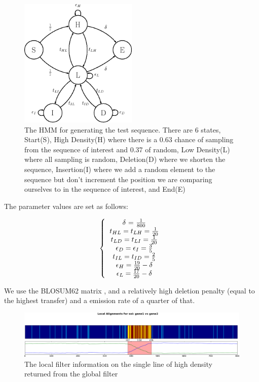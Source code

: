 \documentclass[phd,tocprelim]{cornell}
\begin{document}
\pagebreak

\begin{figure}[hpt]
	\centering
		\includegraphics[width=0.5\textwidth]{figures/velvetrope/HMMpic.png}
        \caption[HMM for synthetic NW comparison]{The HMM for generating the test sequence. There are 6 states, Start(S), High Density(H) where there is a 0.63 chance of sampling from the sequence of interest and 0.37 of random, Low Density(L) where all sampling is random, Deletion(D) where we shorten the sequence, Insertion(I) where we add a random element to the sequence but don't increment the position we are comparing ourselves to in the sequence of interest, and End(E)}
	\label{fig:99}
\end{figure}

The parameter values are set as follows:

\begin{equation}
    \left\{\begin{tabular}{c} $\delta$ = $\frac{1}{800}$ \\ $t_{HL} = t_{LH} = \frac{1}{20}$ \\ $t_{LD} = t_{LI} = \frac{1}{20}$ \\ $\epsilon_{D} = \epsilon_{I} = \frac{3}{5}$ \\ $t_{IL} = t_{ID} = \frac{2}{5}$ \\ $\epsilon_{H} = \frac{19}{20} - \delta$ \\ $\epsilon_{L} = \frac{17}{20} - \delta$ \end{tabular} \right.
\end{equation}

We use the BLOSUM62 matrix \cite{Henikoff1992}, and a relatively high deletion penalty (equal to the highest transfer) and a emission rate of a quarter of that.

\begin{figure}[hpt]
	\centering
		\includegraphics[width=1.0\textwidth]{figures/velvetrope/hmm1_1.png}
        \caption[Local Velvetrope filter of NW HMM test]{The local filter information on the single line of high density returned from the global filter}
	\label{fig:05}
\end{figure}
\end{document}
